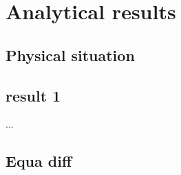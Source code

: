 \section{Analytical results}

\subsection{Physical situation}

\subsection{result 1}

...

\subsection{Equa diff}
\label{sec:solution_anal}
